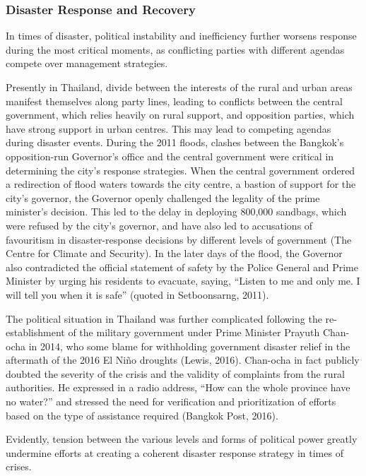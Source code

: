 \subsubsection{Disaster Response and Recovery}

In times of disaster, political instability and inefficiency further worsens response during the most critical moments, as conflicting parties with different agendas compete over management strategies. 

Presently in Thailand, divide between the interests of the rural and urban areas manifest themselves along party lines, leading to conflicts between the central government, which relies heavily on rural support, and opposition parties, which have strong support in urban centres. This may lead to competing agendas during disaster events. During the 2011 floods, clashes between the Bangkok’s opposition-run Governor’s office and the central government were critical in determining the city’s response strategies. When the central government ordered a redirection of flood waters towards the city centre, a bastion of support for the city’s governor, the Governor openly challenged the legality of the prime minister’s decision. This led to the delay in deploying 800,000 sandbags, which were refused by the city’s governor, and have also led to accusations of favouritism in disaster-response decisions by different levels of government (The Centre for Climate and Security). In the later days of the flood, the Governor also contradicted the official statement of safety by the Police General and Prime Minister by urging his residents to evacuate, saying, “Listen to me and only me. I will tell you when it is safe” (quoted in Setboonsarng, 2011).

The political situation in Thailand was further complicated following the re-establishment of the military government under Prime Minister Prayuth Chan-ocha in 2014, who some blame for withholding government disaster relief in the aftermath of the 2016 El Niño droughts (Lewis, 2016). Chan-ocha in fact publicly doubted the severity of the crisis and the validity of complaints from the rural authorities. He expressed in a radio address, “How can the whole province have no water?” and stressed the need for verification and prioritization of efforts based on the type of assistance required (Bangkok Post, 2016). 

Evidently, tension between the various levels and forms of political power greatly undermine efforts at creating a coherent disaster response strategy in times of crises.

